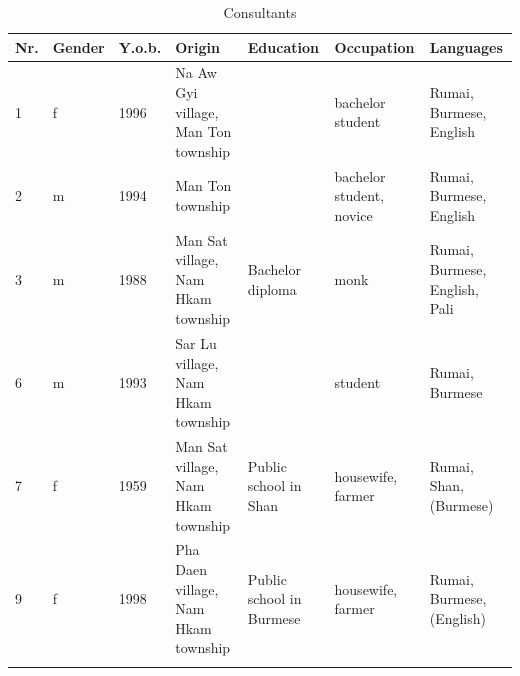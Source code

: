\documentclass[output=paper,colorlinks,citecolor=brown]{langscibook}
\begin{document}
\begin{paperappendix}
\begin{table}
\caption{Consultants}
\begin{tabularx}{\textwidth}{lllQQQQ}
\lsptoprule
{Nr.} & {Gender} & {Y.o.b.} & {Origin} & {Education} & {Occupation} & {Languages}\\
\midrule 
{1} & {f} & {1996} & {Na Aw Gyi village, Man Ton township}  &                       & {bachelor student} & {Rumai, Burmese, English}\\
\tablevspace
{2} & {m} & {1994} & {Man Ton township}                     &                       & {bachelor student, novice} & {Rumai, Burmese, English}\\
\tablevspace
{3} & {m} & {1988} & {Man Sat village, Nam Hkam township}   & {Bachelor diploma}    & {monk} & {Rumai, Burmese, English, Pali}\\
\tablevspace
{6} & {m} & {1993} & {Sar Lu village, Nam Hkam township}    &                       & {student} & {Rumai, Burmese}\\
\tablevspace
{7} & {f} & {1959} & {Man Sat village, Nam Hkam township}   & {Public school in Shan} & {housewife, farmer} & {Rumai, Shan, (Burmese)}\\
\tablevspace
{9} & {f} & {1998} & {Pha Daen village, Nam Hkam township}  & {Public school in Burmese} & {housewife, farmer} & {Rumai, Burmese, (English)}\\
\lspbottomrule
\end{tabularx}
\end{table}
\end{paperappendix}

\sloppy\printbibliography[heading=subbibliography,notkeyword=this]
\end{document}
